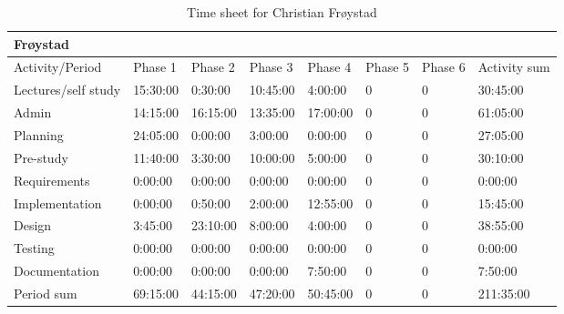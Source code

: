 \documentclass[11pt]{book}
\begin{document}
\begin{table}[H]
\centering
\begin{tabular}{| l | l | l | l | l | l | l | l |}
    \hline
    Frøystad            &             &             &             &             &             &             &                 \\ \hline            
    Activity/Period     & Phase 1     & Phase 2     & Phase  3    & Phase 4     & Phase 5     & Phase 6     & Activity sum    \\ \hline
    Lectures/self study & 15:30:00    & 0:30:00     & 10:45:00    & 4:00:00     & 0           & 0           & 30:45:00        \\ \hline
    Admin               & 14:15:00    & 16:15:00    & 13:35:00    & 17:00:00    & 0           & 0           & 61:05:00        \\ \hline
    Planning            & 24:05:00    & 0:00:00     & 3:00:00     & 0:00:00     & 0           & 0           & 27:05:00        \\ \hline
    Pre-study           & 11:40:00    & 3:30:00     & 10:00:00    & 5:00:00     & 0           & 0           & 30:10:00        \\ \hline
    Requirements        & 0:00:00     & 0:00:00     & 0:00:00     & 0:00:00     & 0           & 0           & 0:00:00         \\ \hline
    Implementation      & 0:00:00     & 0:50:00     & 2:00:00     & 12:55:00    & 0           & 0           & 15:45:00        \\ \hline
    Design              & 3:45:00     & 23:10:00    & 8:00:00     & 4:00:00     & 0           & 0           & 38:55:00        \\ \hline
    Testing             & 0:00:00     & 0:00:00     & 0:00:00     & 0:00:00     & 0           & 0           & 0:00:00         \\ \hline
    Documentation       & 0:00:00     & 0:00:00     & 0:00:00     & 7:50:00     & 0           & 0           & 7:50:00         \\ \hline
    Period sum          & 69:15:00    & 44:15:00    & 47:20:00    & 50:45:00    & 0           & 0           & 211:35:00       \\ \hline
\end{tabular}
\label{tab:appendix_timesheets_christian}
\caption{Time sheet for Christian Frøystad}
\end{table}
\end{document}
